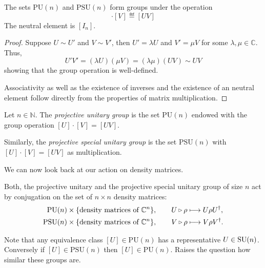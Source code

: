 \documentclass[a4paper, oneside, 12pt]{amsart}
\begin{document}
\begin{lemma}\label{lem:projective-unitary-is-well-defd-group}
  The sets \(\mathrm{PU}(n)\) and \(\mathrm{PSU}(n)\) form groups under the operation
  \begin{equation*}
    [U] \cdot [V] \eqdef [UV]
  \end{equation*}
  The neutral element is \([I_{n}]\).
\end{lemma}
\begin{proof}
  Suppose \( U \sim U' \) and \( V \sim V' \), then \( U' = \lambda U \) and \( V' = \mu V \) for some \( \lambda, \mu \in \mathbb{C} \).
  Thus,
  \begin{equation*}
    U'V' = (\lambda U)(\mu V) = (\lambda \mu) (UV) \sim UV
  \end{equation*}
  showing that the group operation is well-defined.

  Associativity as well as the existence of inverses and the  existence of an neutral element follow directly from the properties of matrix multiplication.
\end{proof}

\begin{definition}\label{def:pun-sun}
  Let \(n\in \mathbb{N}\).
  The \emph{projective unitary group} is the set \(\mathrm{PU}(n)\)  endowed with the group operation \([U] \cdot [V] = [UV]\).

  Similarly, the \emph{projective special unitary group} is the set \( \mathrm{PSU}(n) \) with \([U] \cdot [V] = [UV]\) as multiplication.
\end{definition}

We can now look back at our action on density matrices.

\begin{example}\label{ex:psun-acts-on-density-matrices}
  Both, the projective unitary and the projective special unitary group of size \(n\) act by conjugation on the set of \(n\times n\) density matrices:
  \begin{align*}
    \mathrm{PU}(n) &\times\{\text{density matrices of } \mathbb{C}^{n}\}, \qquad
                     U\lact \rho \mapsto U\rho U^{\dagger}, \\
    \mathrm{PSU}(n) &\times\{\text{density matrices of } \mathbb{C}^{n}\}, \qquad
                      V\lact \rho \mapsto V\rho V^{\dagger}.
  \end{align*}
\end{example}
Note that any equivalence class \([U]\in \mathrm{PU}(n)\) has a representative \(U \in \operatorname{SU}(n)\).
Conversely if \([U]\in \mathrm{PSU}(n)\) then \([U]\in \mathrm{PU}(n)\).
Raises the question how similar these groups are.
\end{document}
